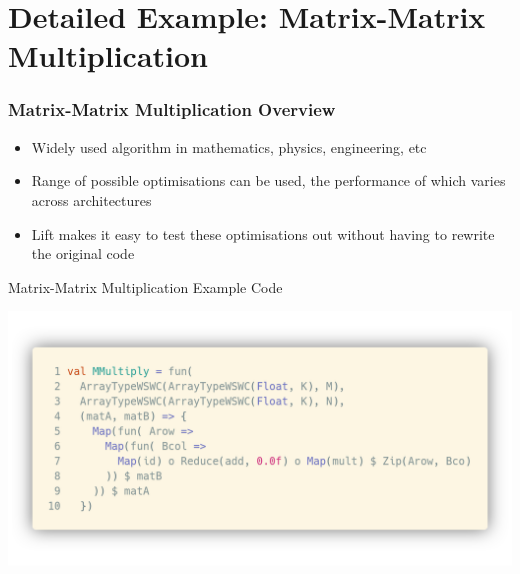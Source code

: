 \documentclass[10pt]{beamer}
\begin{document}
\section{Detailed Example: Matrix-Matrix Multiplication }

\begin{frame}
\frametitle{Matrix-Matrix Multiplication Overview}
\vspace{.2cm}
\begin{itemize}
    \item Widely used algorithm in mathematics, physics, engineering, etc
    \item Range of possible optimisations can be used, the performance of which varies across architectures
    \item Lift makes it easy to test these optimisations out without having to rewrite the original code 

\end{itemize}
\vspace{-1.2cm}
\end{frame}

\begin{frame}{Matrix-Matrix Multiplication Example Code}
        \begin{block}{}
        \begin{center}
            \includegraphics[width=\textwidth]{../images/matrixMatrix.png}
        \end{center}
        \end{block}
\end{frame}
\end{document}
